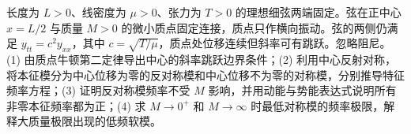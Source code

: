 长度为 \(L>0\)、线密度为 \(\mu>0\)、张力为 \(T>0\) 的理想细弦两端固定。弦在正中心 \(x=L/2\) 与质量 \(M>0\) 的微小质点固定连接，质点只作横向振动。弦的两侧仍满足 \(y_{tt}=c^2 y_{xx}\)，其中 \(c=\sqrt{T/\mu}\)，质点处位移连续但斜率可有跳跃。忽略阻尼。
(1) 由质点牛顿第二定律导出中心的斜率跳跃边界条件；(2) 利用中心反射对称，将本征模分为中心位移为零的反对称模和中心位移不为零的对称模，分别推导特征频率方程；(3) 证明反对称模频率不受 \(M\) 影响，并用动能与势能表达式说明所有非零本征频率都为正；(4) 求 \(M\to0^+\) 和 \(M\to\infty\) 时最低对称模的频率极限，解释大质量极限出现的低频软模。
